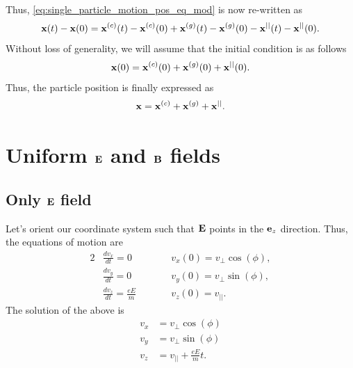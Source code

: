 \documentclass[a4paper,11pt]{report}
\begin{document}
Thus, \cref{eq:single_particle_motion_pos_eq_mod} is now re-written as
\begin{equation}
    \mathbf{x}(t) - \mathbf{x}(0) = \mathbf{x}^{(c)}(t) - \mathbf{x}^{(c)}(0) + \mathbf{x}^{(g)}(t) - \mathbf{x}^{(g)}(0) - \mathbf{x}^{||}(t) - \mathbf{x}^{||}(0).
\end{equation}
Without loss of generality, we will assume that the initial condition is as follows
\begin{equation}
    \mathbf{x}(0) = \mathbf{x}^{(c)}(0) + \mathbf{x}^{(g)}(0) + \mathbf{x}^{||}(0).
\end{equation}
Thus, the particle position is finally expressed as
\begin{equation}
    \label{eq:single_particle_motion_pos_general}
    \mathbf{x} = \mathbf{x}^{(c)} + \mathbf{x}^{(g)} + \mathbf{x}^{||}.
\end{equation}


 
\section{Uniform $\mathbf{E}$ and $\mathbf{B}$ fields}

\subsection{Only $\mathbf{E}$ field}
Let's orient our coordinate system such that $\mathbf{E}$ points in the $\mathbf{e}_z$ direction. Thus, the equations of motion are
\begin{alignat}{2}
    &\frac{d v_x}{dt} = 0  \qquad && v_x(0) = v_\perp \cos(\phi), \nonumber \\
    &\frac{d v_y}{dt} = 0  \qquad && v_y(0) = v_\perp \sin(\phi), \nonumber \\
    &\frac{d v_z}{dt} = \frac{e E}{m}  \qquad && v_z(0) = v_{||}.
\end{alignat}
The solution of the above is
\begin{align}
    v_x &= v_\perp \cos(\phi) \nonumber \\
    v_y &= v_\perp \sin(\phi) \nonumber \\
    v_z &= v_{||} + \frac{e E}{m} t.
\end{align}


\end{document}
